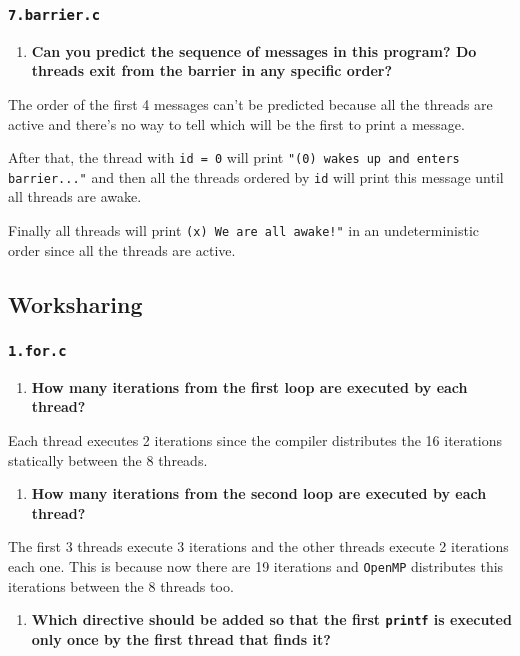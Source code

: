 \documentclass[a4paper]{article}
\begin{document}
\subsubsection{\texttt{7.barrier.c}}

\begin{enumerate}
	\item \textbf{Can you predict the sequence of messages in this program? Do threads exit from the barrier in any specific order?}
\end{enumerate}

The order of the first 4 messages can't be predicted because all the threads are active and there's no way to tell which will be the first to print a message.

After that, the thread with \verb|id = 0| will print \verb|"(0) wakes up and enters barrier..."| and then all the threads ordered by \verb|id| will print this message until all threads are awake.

Finally all threads will print \verb|(x) We are all awake!"| in an undeterministic order since all the threads are active.

\subsection{Worksharing}
\subsubsection{\texttt{1.for.c}}

\begin{enumerate}
	\item \textbf{How many iterations from the first loop are executed by each thread?}
\end{enumerate}

Each thread executes 2 iterations since the compiler distributes the 16 iterations statically between the 8 threads.

\begin{enumerate}[resume]
	\item \textbf{How many iterations from the second loop are executed by each thread?}
\end{enumerate}

The first 3 threads execute 3 iterations and the other threads execute 2 iterations each one. This is because now there are 19 iterations and \verb|OpenMP| distributes this iterations between the 8 threads too.

\begin{enumerate}[resume]
	\item \textbf{Which directive should be added so that the first \texttt{printf} is executed only once by the first thread that finds it?}
\end{enumerate}
\end{document}
